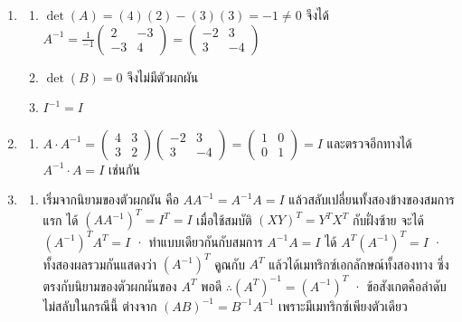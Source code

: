 \begin{enumerate}[label={},leftmargin=0pt,start=7]
    \item
    \begin{enumerate}[label=\textbf{\thechapter.\arabic{enumi}.\arabic*}]
        \item $\det(A) = (4)(2)-(3)(3) = -1 \neq 0$ จึงได้ $A^{-1} = \frac{1}{-1}\begin{pmatrix}2 & -3\\ -3 & 4\end{pmatrix} = \begin{pmatrix}-2 & 3\\ 3 & -4\end{pmatrix}$
        \item $\det(B) = 0$ จึงไม่มีตัวผกผัน
        \item $I^{-1} = I$
    \end{enumerate}
    \item
    \begin{enumerate}[label=\textbf{\thechapter.\arabic{enumi}.\arabic*}]
        \item $A\cdot A^{-1} = \begin{pmatrix}4 & 3\\ 3 & 2\end{pmatrix}\begin{pmatrix}-2 & 3\\ 3 & -4\end{pmatrix} = \begin{pmatrix}1 & 0\\ 0 & 1\end{pmatrix} = I$ และตรวจอีกทางได้ $A^{-1}\cdot A = I$ เช่นกัน
    \end{enumerate}
    \item
    \begin{enumerate}[label=\textbf{\thechapter.\arabic{enumi}.\arabic*}]
        \item เริ่มจากนิยามของตัวผกผัน คือ $AA^{-1} = A^{-1}A = I$ แล้วสลับเปลี่ยนทั้งสองข้างของสมการแรก ได้ $(AA^{-1})^T = I^T = I$ เมื่อใช้สมบัติ $(XY)^T = Y^T X^T$ กับฝั่งซ้าย จะได้ $(A^{-1})^T A^T = I$ · ทำแบบเดียวกันกับสมการ $A^{-1}A = I$ ได้ $A^T (A^{-1})^T = I$ · ทั้งสองผลรวมกันแสดงว่า $(A^{-1})^T$ คูณกับ $A^T$ แล้วได้เมทริกซ์เอกลักษณ์ทั้งสองทาง ซึ่งตรงกับนิยามของตัวผกผันของ $A^T$ พอดี $\therefore (A^T)^{-1} = (A^{-1})^T$ · ข้อสังเกตคือลำดับไม่สลับในกรณีนี้ ต่างจาก $(AB)^{-1} = B^{-1}A^{-1}$ เพราะมีเมทริกซ์เพียงตัวเดียว
    \end{enumerate}
\end{enumerate}

